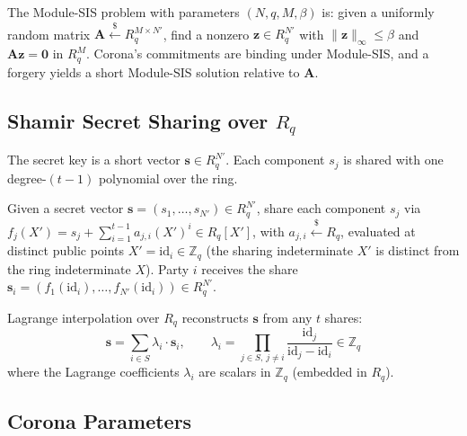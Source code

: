 \begin{definition}
\label{def:msis}
The Module-SIS problem with parameters $(N, q, M, \beta)$ is: given a uniformly random
matrix $\mathbf{A} \stackrel{\$}{\leftarrow} R_q^{M \times N'}$, find a nonzero
$\mathbf{z} \in R_q^{N'}$ with $\|\mathbf{z}\|_\infty \le \beta$ and
$\mathbf{A}\mathbf{z} = \mathbf{0}$ in $R_q^{M}$. Corona's commitments are binding under
Module-SIS, and a forgery yields a short Module-SIS solution relative to $\mathbf{A}$.
\end{definition}

\subsection{Shamir Secret Sharing over $R_q$}

The secret key is a short vector $\mathbf{s} \in R_q^{N'}$. Each component $s_j$ is shared
with one degree-$(t-1)$ polynomial over the ring.

\begin{definition}
\label{def:shamir}
Given a secret vector $\mathbf{s} = (s_1, \ldots, s_{N'}) \in R_q^{N'}$, share each
component $s_j$ via $f_j(X') = s_j + \sum_{i=1}^{t-1} a_{j,i} (X')^i \in R_q[X']$, with
$a_{j,i} \stackrel{\$}{\leftarrow} R_q$, evaluated at distinct public points
$X' = \mathrm{id}_i \in \mathbb{Z}_q$ (the sharing indeterminate $X'$ is distinct from the
ring indeterminate $X$). Party $i$ receives the share
$\mathbf{s}_i = (f_1(\mathrm{id}_i), \ldots, f_{N'}(\mathrm{id}_i)) \in R_q^{N'}$.
\end{definition}

Lagrange interpolation over $R_q$ reconstructs $\mathbf{s}$ from any $t$ shares:
\begin{equation}
\mathbf{s} = \sum_{i \in S} \lambda_i \cdot \mathbf{s}_i, \qquad
\lambda_i = \prod_{j \in S,\, j \neq i} \frac{\mathrm{id}_j}{\mathrm{id}_j - \mathrm{id}_i} \in \mathbb{Z}_q
\label{eq:lagrange}
\end{equation}
where the Lagrange coefficients $\lambda_i$ are scalars in $\mathbb{Z}_q$ (embedded in $R_q$).

\subsection{Corona Parameters}

